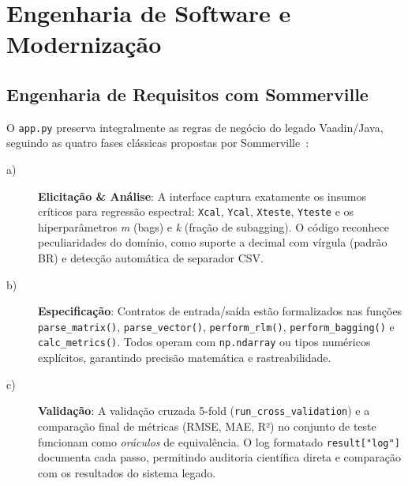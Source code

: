 \chapter{Engenharia de Software e Modernização}
\section{Engenharia de Requisitos com Sommerville}
O \verb|app.py| preserva integralmente as regras de negócio do legado Vaadin/Java, seguindo as quatro fases clássicas propostas por Sommerville~\cite{sommerville2011}:
\begin{description}
\item[a)] \textbf{Elicitação \& Análise}: A interface captura exatamente os insumos críticos para regressão espectral: \verb|Xcal|, \verb|Ycal|, \verb|Xteste|, \verb|Yteste| e os hiperparâmetros \textit{m} (bags) e \textit{k} (fração de subagging). O código reconhece peculiaridades do domínio, como suporte a decimal com vírgula (padrão BR) e detecção automática de separador CSV.
\item[b)] \textbf{Especificação}: Contratos de entrada/saída estão formalizados nas funções \verb|parse_matrix()|, \verb|parse_vector()|, \verb|perform_rlm()|, \verb|perform_bagging()| e \verb|calc_metrics()|. Todos operam com \verb|np.ndarray| ou tipos numéricos explícitos, garantindo precisão matemática e rastreabilidade.
\item[c)] \textbf{Validação}: A validação cruzada 5-fold (\verb|run_cross_validation|) e a comparação final de métricas (RMSE, MAE, R²) no conjunto de teste funcionam como \textit{oráculos} de equivalência. O log formatado \verb|result["log"]| documenta cada passo, permitindo auditoria científica direta e comparação com os resultados do sistema legado.
\end{description}

